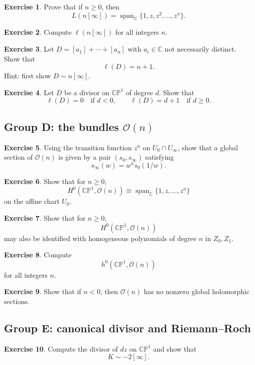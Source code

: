 \documentclass[11pt]{article}
\newcommand{\C}{\mathbb{C}}
\newcommand{\CP}{\mathbb{CP}}
\newcommand{\OO}{\mathcal{O}}
\newcommand{\ellD}{\ell}
\newcommand{\CPone}{\CP^1}
\theoremstyle{definition}
\newtheorem{exercise}{Exercise}[section]
\theoremstyle{plain}
\begin{document}
\begin{exercise}
Prove that if $n\ge 0$, then
\[
L(n[\infty])=\operatorname{span}_{\C}\{1,z,z^2,\dots,z^n\}.
\]
\end{exercise}

\begin{exercise}
Compute $\ellD(n[\infty])$ for all integers $n$.
\end{exercise}

\begin{exercise}
Let $D=[a_1]+\cdots+[a_n]$ with $a_i\in \C$ not necessarily distinct. Show that
\[
\ellD(D)=n+1.
\]
Hint: first show $D\sim n[\infty]$.
\end{exercise}

\begin{exercise}
Let $D$ be a divisor on $\CPone$ of degree $d$. Show that
\[
\ellD(D)=0\quad\text{if }d<0,
\qquad
\ellD(D)=d+1\quad\text{if }d\ge 0.
\]
\end{exercise}

\subsection{Group D: the bundles \texorpdfstring{$\OO(n)$}{O(n)}}
\begin{exercise}
Using the transition function $z^n$ on $U_0\cap U_\infty$, show that a global section of $\OO(n)$ is given by a pair $(s_0,s_\infty)$ satisfying
\[
s_\infty(w)=w^n s_0(1/w).
\]
\end{exercise}

\begin{exercise}
Show that for $n\ge 0$,
\[
H^0(\CPone,\OO(n))\cong \operatorname{span}_{\C}\{1,z,\dots,z^n\}
\]
on the affine chart $U_0$.
\end{exercise}

\begin{exercise}
Show that for $n\ge 0$,
\[
H^0(\CPone,\OO(n))
\]
may also be identified with homogeneous polynomials of degree $n$ in $Z_0,Z_1$.
\end{exercise}

\begin{exercise}
Compute
\[
h^0(\CPone,\OO(n))
\]
for all integers $n$.
\end{exercise}

\begin{exercise}
Show that if $n<0$, then $\OO(n)$ has no nonzero global holomorphic sections.
\end{exercise}

\subsection{Group E: canonical divisor and Riemann--Roch}
\begin{exercise}
Compute the divisor of $dz$ on $\CPone$ and show that
\[
K\sim -2[\infty].
\]
\end{exercise}
\end{document}
